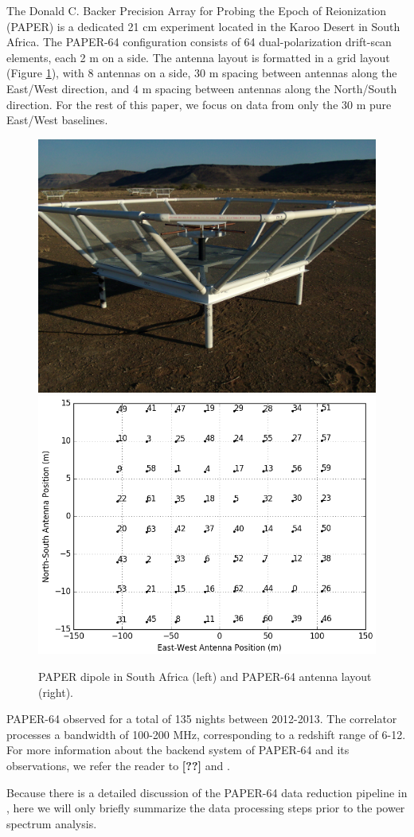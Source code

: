 \documentclass[preprint2,numberedappendix,tighten,twocolappendix]{aastex6}  %
\newcommand{\cc}[1]{{\color{purple} \textbf{[#1]}}}
\begin{document}
The Donald C. Backer Precision Array for Probing the Epoch of Reionization (PAPER) is a dedicated 21 cm experiment located in the Karoo Desert in South Africa. The PAPER-64 configuration consists of 64 dual-polarization drift-scan elements, each 2 m on a side. The antenna layout is formatted in a grid layout (Figure \ref{fig:paper}), with 8 antennas on a side, 30 m spacing between antennas along the East/West direction, and 4 m spacing between antennas along the North/South direction. For the rest of this paper, we focus on data from only the 30 m pure East/West baselines. 

\begin{figure}
	\centering
	\includegraphics[height=0.35\textwidth]{plots/paper_dipole.png}
	\includegraphics[height=0.35\textwidth]{plots/antenna_layout.png}
	\caption{PAPER dipole in South Africa (left) and PAPER-64 antenna layout (right).}
	\label{fig:paper}
\end{figure}

PAPER-64 observed for a total of 135 nights between 2012-2013. The correlator processes a bandwidth of 100-200 MHz, corresponding to a redshift range of 6-12. For more information about the backend system of PAPER-64 and its observations, we refer the reader to \cc{??} and \citet{ali_et_al2015}.

Because there is a detailed discussion of the PAPER-64 data reduction pipeline in \citet{ali_et_al2015}, here we will only briefly summarize the data processing steps prior to the power spectrum analysis. 
\end{document}
